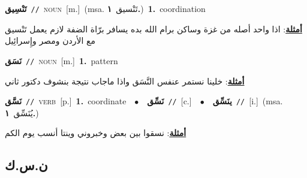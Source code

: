\documentclass[10pt,a4paper,twoside]{article} %
\begin{document}
\begin{multicols}{2}
{\setlength\topsep{0pt}\textbf{\foreignlanguage{arabic}{تَنْسِيق}}\ {\color{gray}\texttt{//}\color{black}}\ \textsc{noun}\ [m.]\ \color{gray}(msa. \foreignlanguage{arabic}{تَنْسيق}~\foreignlanguage{arabic}{\textbf{١.}})\color{black}\ \textbf{1.}~coordination\  \begin{flushright}\color{gray}\foreignlanguage{arabic}{\textbf{\underline{\foreignlanguage{arabic}{أمثلة}}}: اذا واحد أصله من غزة وساكن برام الله بده يسافر برّاة الضفة لازم يعمل تَنْسيق مع الأردن ومصر وإِسرائِيل}\end{flushright}\color{black}} \vspace{2mm}

{\setlength\topsep{0pt}\textbf{\foreignlanguage{arabic}{نَسَق}}\ {\color{gray}\texttt{//}\color{black}}\ \textsc{noun}\ [m.]\ \textbf{1.}~pattern\  \begin{flushright}\color{gray}\foreignlanguage{arabic}{\textbf{\underline{\foreignlanguage{arabic}{أمثلة}}}: خلينا نستمر عنفس النَّسَق واذا ماجاب نتيجة بنشوف دكتور ثاني}\end{flushright}\color{black}} \vspace{2mm}

{\setlength\topsep{0pt}\textbf{\foreignlanguage{arabic}{نَسَّق}}\ {\color{gray}\texttt{//}\color{black}}\ \textsc{verb}\ [p.]\ \textbf{1.}~coordinate\ \ $\bullet$\ \ \setlength\topsep{0pt}\textbf{\foreignlanguage{arabic}{نَسِّق}}\ {\color{gray}\texttt{//}\color{black}}\ [c.]\ \ $\bullet$\ \ \setlength\topsep{0pt}\textbf{\foreignlanguage{arabic}{ينَسِّق}}\ {\color{gray}\texttt{//}\color{black}}\ [i.]\ \color{gray}(msa. \foreignlanguage{arabic}{يُنَسِّق}~\foreignlanguage{arabic}{\textbf{١.}})\color{black}\  \begin{flushright}\color{gray}\foreignlanguage{arabic}{\textbf{\underline{\foreignlanguage{arabic}{أمثلة}}}: نسقوا بين بعض وخبروني وينتا أنسب يوم الكم}\end{flushright}\color{black}} \vspace{2mm}

\vspace{-3mm}
\subsection*{\color{blue}\foreignlanguage{arabic}{ن.س.ك}\color{blue}{}} 


\end{multicols}
\end{document}
